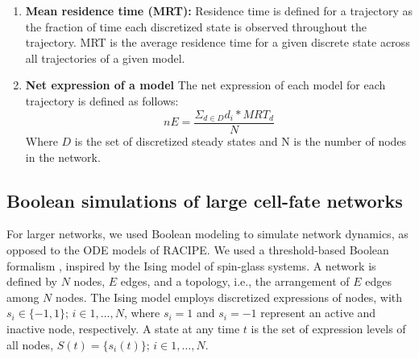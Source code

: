 \documentclass[11pt]{article}
\begin{document}
\begin{enumerate}
    \item \textbf{Mean residence time (MRT):} Residence time is defined for a trajectory as the fraction of time each discretized state is observed throughout the trajectory. MRT is the average residence time for a given discrete state across all trajectories of a given model. 
    \item \textbf{Net expression of a model} The net expression of each model for each trajectory is defined as follows:
    \begin{equation}
        nE = \frac{\Sigma_{d \in D} d_i*MRT_d}{N}
    \end{equation}
    Where $D$ is the set of discretized steady states and N is the number of nodes in the network. 
\end{enumerate}


\subsection{Boolean simulations of large cell-fate networks}

For larger networks, we used Boolean modeling to simulate network dynamics, as opposed to the ODE models of RACIPE. We used a threshold-based Boolean formalism \cite{FontClos2018}, inspired by the Ising model of spin-glass systems. A network is defined by $N$ nodes, $E$ edges, and a topology, i.e., the arrangement of $E$ edges among $N$ nodes. The Ising model employs discretized expressions of nodes, with $s_i \in \{-1, 1\}$; $i \in 1, \ldots, N$, where $s_i = 1$ and $s_i = -1$ represent an active and inactive node, respectively. A state at any time $t$ is the set of expression levels of all nodes, $S(t) = \{s_i(t)\}$; $i \in 1, \ldots, N$.
\end{document}
